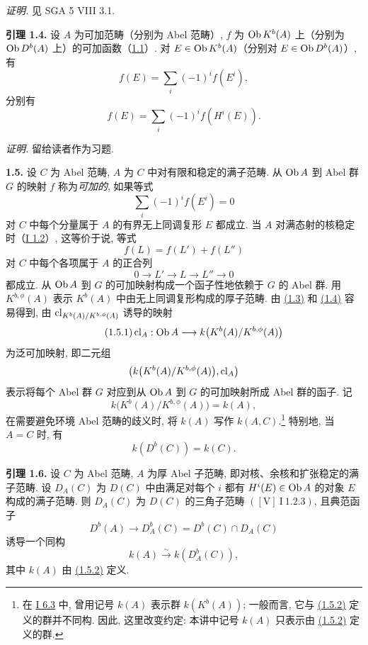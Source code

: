 \emph{证明.} 见 SGA 5 VIII 3.1.

\textbf{引理 1.4.} 设 \(A\) 为可加范畴（分别为 Abel 范畴）, \(f\) 为 \(\operatorname{Ob} K^b(A)\) 上（分别为 \(\operatorname{Ob} D^b(A)\) 上）的可加函数（\hyperlink{sga6.e04.para.1-1}{1.1}）. 对 \(E\in\operatorname{Ob} K^b(A)\)（分别对 \(E\in\operatorname{Ob} D^b(A)\)）, 有
\[
 f(E)=\sum_i(-1)^i f(E^i),
\]
分别有
\[
 f(E)=\sum_i(-1)^i f(H^i(E)).
\]

\emph{证明.} 留给读者作为习题.

\textbf{1.5.} 设 \(C\) 为 Abel 范畴, \(A\) 为 \(C\) 中对有限和稳定的满子范畴. 从 \(\operatorname{Ob} A\) 到 Abel 群 \(G\) 的映射 \(f\) 称为\emph{可加的}, 如果等式
\[
 \sum_i(-1)^i f(E^i)=0
\]
对 \(C\) 中每个分量属于 \(A\) 的有界无上同调复形 \(E\) 都成立. 当 \(A\) 对满态射的核稳定时（\hyperlink{sga6.e01.sec.1.2}{I 1.2}）, 这等价于说, 等式
\[
 f(L)=f(L')+f(L'')
\]
对 \(C\) 中每个各项属于 \(A\) 的正合列
\[
 0\longrightarrow L'\longrightarrow L\longrightarrow L''\longrightarrow0
\]
都成立. 从 \(\operatorname{Ob} A\) 到 \(G\) 的可加映射构成一个函子性地依赖于 \(G\) 的 Abel 群. 用 \(K^{b,\phi}(A)\) 表示 \(K^b(A)\) 中由无上同调复形构成的厚子范畴. 由 \hyperlink{sga6.e04.lem.1-3}{(1.3)} 和 \hyperlink{sga6.e04.lem.1-4}{(1.4)} 容易得到, 由 \(\operatorname{cl}_{K^b(A)/K^{b,\phi}(A)}\) 诱导的映射
\begin{equation}\tag{1.5.1}
 \operatorname{cl}_A:\operatorname{Ob} A\longrightarrow k\bigl(K^b(A)/K^{b,\phi}(A)\bigr)
\end{equation}
为泛可加映射, 即二元组
\[
 \left(k\bigl(K^b(A)/K^{b,\phi}(A)\bigr),\operatorname{cl}_A\right)
\]
表示将每个 Abel 群 \(G\) 对应到从 \(\operatorname{Ob} A\) 到 \(G\) 的可加映射所成 Abel 群的函子. 记
\begin{equation}\tag{1.5.2}
 k\bigl(K^b(A)/K^{b,\phi}(A)\bigr)=k(A),
\end{equation}
在需要避免环境 Abel 范畴的歧义时, 将 \(k(A)\) 写作 \(k(A,C)\).\footnote{在 \hyperlink{sga6.e01.para.6-3}{I 6.3} 中, 曾用记号 \(k(A)\) 表示群 \(k(K^b(A))\); 一般而言, 它与 \hyperlink{sga6.e04.eq.1-5-2}{(1.5.2)} 定义的群并不同构. 因此, 这里改变约定: 本讲中记号 \(k(A)\) 只表示由 \hyperlink{sga6.e04.eq.1-5-2}{(1.5.2)} 定义的群.}
特别地, 当 \(A=C\) 时, 有
\begin{equation}\tag{1.5.3}
 k(D^b(C))=k(C).
\end{equation}

\textbf{引理 1.6.} 设 \(C\) 为 Abel 范畴, \(A\) 为厚 Abel 子范畴, 即对核、余核和扩张稳定的满子范畴. 设 \(D_A(C)\) 为 \(D(C)\) 中由满足对每个 \(i\) 都有 \(H^i(E)\in\operatorname{Ob} A\) 的对象 \(E\) 构成的满子范畴. 则 \(D_A(C)\) 为 \(D(C)\) 的三角子范畴 \(([\mathrm V]\ \mathrm I\ 1.2.3)\), 且典范函子
\[
 D^b(A)\longrightarrow D_A^b(C)=D^b(C)\cap D_A(C)
\]
诱导一个同构
\[
 k(A)\xrightarrow{\sim} k(D_A^b(C)),
\]
其中 \(k(A)\) 由 \hyperlink{sga6.e04.eq.1-5-2}{(1.5.2)} 定义.

